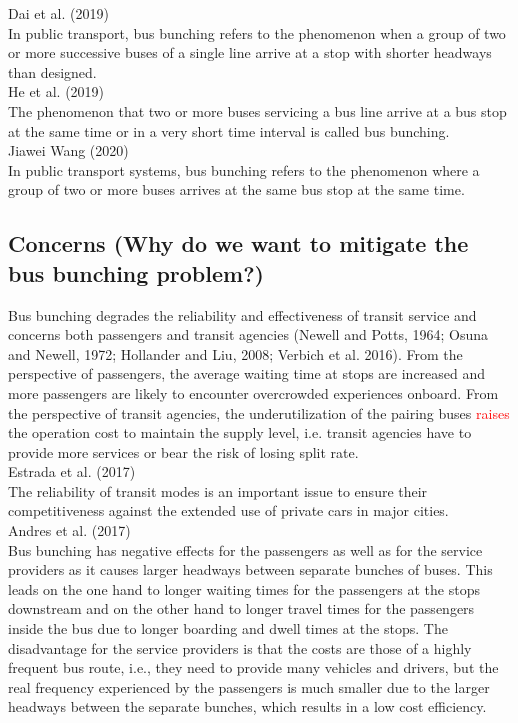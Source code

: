 \documentclass{article}
\begin{document}
\noindent \textrm{Dai et al. (2019)}\\
In public transport, 
bus bunching refers to the phenomenon 
when a group of two or more successive buses of a single line arrive at a stop 
with shorter headways than designed.\\

\noindent \textrm{He et al. (2019)}\\
The phenomenon that two or more buses servicing a bus line 
arrive at a bus stop at the same time or in a very short time interval 
is called bus bunching.\\

\noindent \textrm{Jiawei Wang (2020)}\\
In public transport systems, 
bus bunching refers to the phenomenon 
where a group of two or more buses arrives 
at the same bus stop at the same time.\\

\subsection*{Concerns (Why do we want to mitigate the bus bunching problem?)}
Bus bunching degrades the reliability and effectiveness of transit service
and concerns both passengers and transit agencies (Newell and Potts, 1964; Osuna and Newell, 1972; Hollander and Liu, 2008; Verbich et al. 2016).
From the perspective of passengers, the average waiting time at stops are increased and more passengers are likely to encounter overcrowded experiences onboard.
From the perspective of transit agencies, the underutilization of the pairing buses \textcolor{red}{raises} the operation cost to maintain the supply level,
i.e. transit agencies have to provide more services or bear the risk of losing split rate.\\

\noindent \textrm{Estrada et al. (2017)}\\
The reliability of transit modes is an important issue 
to ensure their competitiveness against the extended use of private cars in major cities.\\

\noindent \textrm{Andres et al. (2017)}\\
Bus bunching has negative effects for the passengers as well as for the service providers 
as it causes larger headways between separate bunches of buses. 
This leads on the one hand to longer waiting times for the passengers at the stops downstream 
and on the other hand to longer travel times for the passengers inside the bus 
due to longer boarding and dwell times at the stops.
The disadvantage for the service providers is that the costs are those of a highly frequent bus route, 
i.e., they need to provide many vehicles and drivers, 
but the real frequency experienced by the passengers is much smaller 
due to the larger headways between the separate bunches, 
which results in a low cost efficiency.\\
\end{document}

